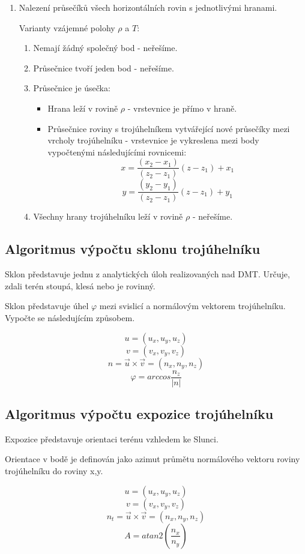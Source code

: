 \documentclass[11pt]{article}
\begin{document}
\begin{enumerate}
\item Nalezení průsečíků všech horizontálních rovin s jednotlivými hranami.

Varianty vzájemné polohy $\rho$ a $T$:
	\begin{enumerate}
		\item Nemají žádný společný bod - neřešíme.
		\item Průsečnice tvoří jeden bod - neřešíme.
		\item Průsečnice je úsečka:
		\begin{itemize}
		\item Hrana leží v rovině $\rho$ - vrstevnice je přímo v hraně.
		\item Průsečnice roviny s trojúhelníkem vytvářející nové průsečíky mezi vrcholy trojúhelníku - vrstevnice je vykreslena mezi body vypočtenými následujícími rovnicemi:
$$  x = \frac{(x_2 - x_1)}{(z_2 - z_1)} (z - z_1) + x_1 $$ 		
$$  y = \frac{(y_2 - y_1)}{(z_2 - z_1)} (z - z_1) + y_1 $$ 
		\end{itemize}
		\item Všechny hrany trojúhelníku leží v rovině $\rho$ - neřešíme.	
	\end{enumerate}

\end{enumerate}
 
\subsection{Algoritmus výpočtu sklonu trojúhelníku}
Sklon představuje jednu z analytických úloh realizovaných nad DMT. Určuje, zdali terén stoupá, klesá nebo je rovinný.

Sklon představuje úhel $ \varphi $ mezi svislicí a normálovým vektorem trojúhelníku. Vypočte se následujícím způsobem.

$$  u = (u_x, u_y, u_z)$$
$$  v = (v_x, v_y, v_z)$$
$$ n = \vec{u}\times \vec{v} = (n_x, n_y, n_z)$$
$$ \varphi = arccos \frac{n_z}{|n|} $$ 

\subsection{Algoritmus výpočtu expozice trojúhelníku}
Expozice představuje orientaci terénu vzhledem ke Slunci.

Orientace v bodě je definován jako azimut průmětu normálového vektoru roviny trojúhelníku do roviny x,y.

$$  u = (u_x, u_y, u_z)$$
$$  v = (v_x, v_y, v_z)$$
$$ n_t = \vec{u}\times \vec{v} = (n_x, n_y, n_z)$$
$$ A =atan2( \frac{n_x}{n_y}) $$
\end{document}
